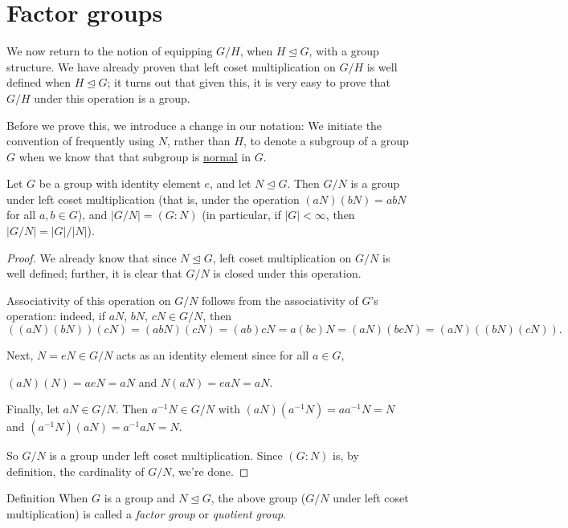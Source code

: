 \section{Factor groups}

 We now return to the notion
of equipping $G/H$, when $H\unlhd G$, with a group structure.
We have already proven that left coset multiplication on $G/H$
is well defined when $H\unlhd G$; it turns out that given this,
it is very easy to prove that $G/H$ under this operation is a
group.

 Before we prove this, we  introduce a change in our notation: We
initiate the convention of frequently using $N$, rather than $H$, to
denote a subgroup of a group $G$ when we know that that subgroup is
\underline{normal} in $G$.

\begin{thm}\label{} Let $G$ be a group with identity element $e$, and let $N\unlhd G$.  Then $G/N$ is a
group under left coset multiplication (that is, under the operation
$(aN)(bN)=abN$ for all $a,b\in G$), and $|G/N|=(G:N)$ (in
particular, if $|G|<\infty$, then $|G/N|=|G|/|N|$).
\end{thm}

\begin{proof} We already know that since $N\unlhd G$, left coset
multiplication on $G/N$ is well defined; further, it is clear
that $G/N$ is closed under this operation.

Associativity of this operation on $G/N$ follows from the
associativity of $G$'s operation: indeed, if $aN$, $bN$, $cN \in
G/N$, then
$$((aN)(bN))(cN)=(abN)(cN)=(ab)cN=a(bc)N=(aN)(bcN)=(aN)((bN)(cN)).$$

Next, $N=eN\in G/N$ acts as an identity element since for all $a\in
G$,

\begin{center}$(aN)(N)=aeN=aN$ and $N(aN)=eaN=aN$.\end{center}

Finally, let $aN\in G/N$. Then $a^{-1}N\in G/N$ with
$(aN)(a^{-1}N)=aa^{-1}N=N$ and $(a^{-1}N)(aN)=a^{-1}aN=N$.

So $G/N$ is a group under left coset multiplication. Since $(G:N)$
is, by definition, the cardinality of $G/N$, we're done.\end{proof}

\begin{df}{Definition} When $G$ is a group and $N\unlhd G$, the above group
($G/N$ under left coset multiplication) is called a \textit{factor
group} or \textit{quotient group}.\end{df}

